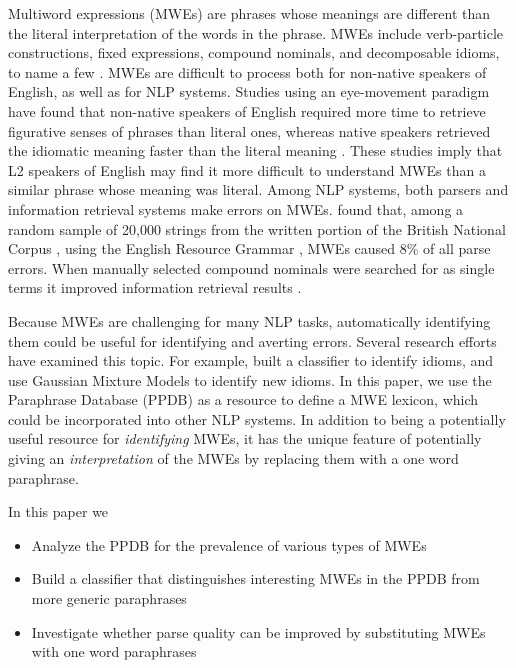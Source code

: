 \documentclass[11pt]{article}
\begin{document}
Multiword expressions (MWEs) are phrases whose meanings are different than the literal interpretation of the words in the phrase. MWEs include verb-particle constructions, fixed expressions, compound nominals, and decomposable idioms, to name a few \cite{Sag2002}.  MWEs are difficult to process both for non-native speakers of English, as well as for NLP systems. Studies using an eye-movement paradigm have found that non-native speakers of English required more time to retrieve figurative senses of phrases than literal ones, whereas native speakers retrieved the idiomatic meaning faster than the literal meaning \cite{siyanova-chanturia-martinez:2014}. These studies imply that L2 speakers of English may find it more difficult to understand MWEs than a similar phrase whose meaning was literal.  Among NLP systems, both parsers and information retrieval systems make errors on MWEs.  found that, among a random sample of 20,000 strings from the written portion of the British National Corpus \cite{Burnard2000}, using the English Resource Grammar \cite{Copestake+Flickinger2000}, MWEs caused 8\% of all parse errors. When manually selected compound nominals were searched for as single terms it improved information retrieval results \cite{Acosta2011}.

Because MWEs are challenging for many NLP tasks, automatically identifying them could be useful for identifying and averting errors.  Several research efforts have examined this topic.  For example,  built a classifier to identify idioms, and  use Gaussian Mixture Models to identify new idioms.  In this paper, we use the Paraphrase Database (PPDB) as a resource to define a MWE lexicon, which could be incorporated into other NLP systems.  In addition to being a potentially useful resource for {\it identifying} MWEs, it has the unique feature of potentially giving an {\it interpretation} of the MWEs by replacing them with a one word paraphrase.  

In this paper we
\begin{itemize}
\item Analyze the PPDB for the prevalence of various types of MWEs
\item Build a classifier that distinguishes interesting MWEs in the PPDB from more generic paraphrases
\item Investigate whether parse quality can be improved by substituting MWEs with one word paraphrases
\end{itemize}
\end{document}
